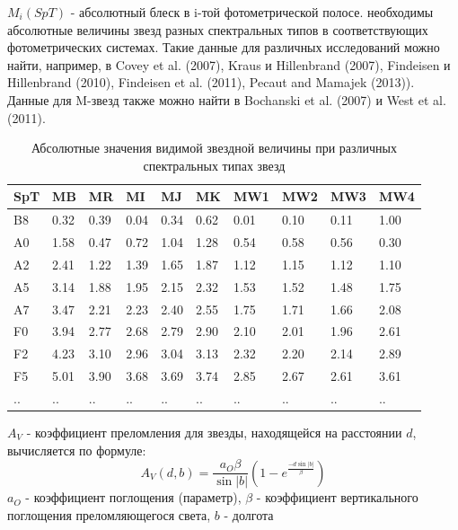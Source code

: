 \documentclass[12pt, a4paper]{article}
\begin{document}
	$M_i(SpT)$ - абсолютный блеск в i-той фотометрической полосе. необходимы абсолютные величины звезд разных спектральных типов в соответствующих фотометрических системах. Такие данные для различных исследований можно найти, например, в Covey et al. (2007), Kraus и Hillenbrand (2007), Findeisen и Hillenbrand (2010), Findeisen et al. (2011), Pecaut and Mamajek (2013)). Данные для M-звезд также можно найти в Bochanski et al. (2007) и West et al. (2011).
	\newline
	\begin{table}
	\centering
	\small
	\setlength{\tabcolsep}{3pt}
	\begin{tabular}{|l|l|l|l|l|l|l|l|l|l|}
	\hline
	SpT & MB    & MR    & MI    & MJ    & MK    & MW1   & MW2   & MW3   & MW4   \\ \hline
	B8  & 0.32  & 0.39  & 0.04  & 0.34  & 0.62  & 0.01  & 0.10  & 0.11  & 1.00  \\ \hline
	A0  & 1.58  & 0.47  & 0.72  & 1.04  & 1.28  & 0.54  & 0.58  & 0.56  & 0.30  \\ \hline
	A2  & 2.41  & 1.22  & 1.39  & 1.65  & 1.87  & 1.12  & 1.15  & 1.12  & 1.10  \\ \hline
	A5  & 3.14  & 1.88  & 1.95  & 2.15  & 2.32  & 1.53  & 1.52  & 1.48  & 1.75  \\ \hline
	A7  & 3.47  & 2.21  & 2.23  & 2.40  & 2.55  & 1.75  & 1.71  & 1.66  & 2.08  \\ \hline
	F0  & 3.94  & 2.77  & 2.68  & 2.79  & 2.90  & 2.10  & 2.01  & 1.96  & 2.61  \\ \hline
	F2  & 4.23  & 3.10  & 2.96  & 3.04  & 3.13  & 2.32  & 2.20  & 2.14  & 2.89  \\ \hline
	F5  & 5.01  & 3.90  & 3.68  & 3.69  & 3.74  & 2.85  & 2.67  & 2.61  & 3.61  \\ \hline
	..  & ..    & ..    & ..    & ..    & ..    & ..    & ..    & ..    & ..    \\ \hline
	\end{tabular}
	\caption{Абсолютные значения видимой звездной величины при различных спектральных типах звезд}
	\end{table}
	$A_V$ - коэффициент преломления для звезды, находящейся на расстоянии $d$, вычисляется по формуле:
	$$
	A_V(d, b) = \frac{a_O \beta}{\sin |b|} \left( 1 - e^{\frac{-d \sin |b|}{\beta}}\right)
	$$
	$a_O$ - коэффициент поглощения (параметр),
	$\beta$ - коэффициент вертикального поглощения преломляющегося света,
	$b$ - долгота
\end{document}
